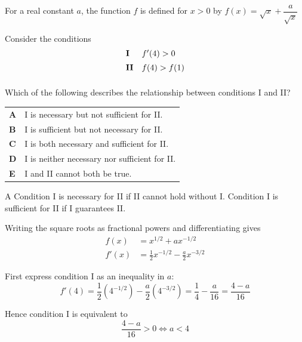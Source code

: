 \documentclass[11pt,a4paper]{article}
\begin{document}
\begin{enumerate}[label=\textbf{\arabic*.},leftmargin=*,itemsep=0pt,start=20]
\questionitem[Logic]
For a real constant $a$, the function $f$ is defined for $x>0$ by $f(x)=\sqrt{x}+\dfrac{a}{\sqrt{x}}$

Consider the conditions
\[
\begin{array}{@{}ll@{}}
\textbf{I} & f'(4)>0 \\[5pt]
\textbf{II} & f(4)>f(1) \\[5pt]
\end{array}
\]

Which of the following describes the relationship between conditions I and II?

\par\vspace*{12pt}
\begin{tabularx}{\linewidth}{@{}>{\bfseries}l Y@{}}
A &
I is necessary but not sufficient for II.
\\[0.8em]
B &
I is sufficient but not necessary for II.
\\[0.8em]
C &
I is both necessary and sufficient for II.
\\[0.8em]
D &
I is neither necessary nor sufficient for II.
\\[0.8em]
E &
I and II cannot both be true.
\\
\end{tabularx}

\begin{djsSolution}{A}
Condition I is necessary for II if II cannot hold without I. Condition I is sufficient for II if I guarantees II.

Writing the square roots as fractional powers and differentiating gives
\[
\begin{aligned}
f(x)&=x^{1/2}+ax^{-1/2}\\[5pt]
f'(x)&=\frac12x^{-1/2}-\frac a2x^{-3/2}
\end{aligned}
\]

First express condition I as an inequality in $a$:
\[
f'(4)=\frac12(4^{-1/2})-\frac a2(4^{-3/2})
=\frac14-\frac a{16}=\frac{4-a}{16}
\]

Hence condition I is equivalent to
\[
\frac{4-a}{16}>0\iff\boxed{a<4}
\]


\end{djsSolution}
\end{enumerate}
\end{document}
